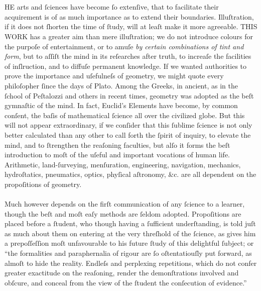 \pagestyle{fancy}
\fancyhf{}
\renewcommand{\headrulewidth}{0pt}
\fancyfoot[C]{\thepage}%

\section[Introduction]{}
\label{sec:intro}

\hfill

\lettrine[lines=3, loversize=1, nindent=0pt]{}{}HE arts and ſciences have become ſo extenſive, that to facilitate their acquirement is of as much importance as to extend their boundaries. Illuſtration, if it does not ſhorten the time of ſtudy, will at leaſt make it more agreeable. T\textsc{HIS WORK} has a greater aim than mere illuſtration; we do not introduce colours for the purpoſe of entertainment, or to amuſe \textit{by certain combinations of tint and form}, but to aſſiſt the mind in its reſearches after truth, to increaſe the facilities of inſlruction, and to diffuſe permanent knowledge. If we wanted authorities to prove the importance and uſefulneſs of geometry, we might quote every philoſopher ſince the days of Plato. Among the Greeks, in ancient, as in the ſchool of Peſtalozzi and others in recent times, geometry was adopted as the beſt gymnaſtic of the mind. In fact, Euclid’s Elements have become, by common conſent, the baſis of mathematical ſcience all over the civilized globe. But this will not appear extraordinary, if we conſider that this ſublime ſcience is not only better calculated than any other to call forth the ſpirit of inquiry, to elevate the mind, and to ſtrengthen the reaſoning faculties, but alſo it forms the beſt introduction to moſt of the uſeful and important vocations of human life.  Arithmetic, land-ſurveying, menſuration, engineering, navigation, mechanics, hydroſtatics, pneumatics, optics, phyſical aſtronomy, \&c. are all dependent on the propoſitions of geometry.\\
\hfill\\
Much however depends on the firſt communication of any ſcience to a learner, though the beſt and moſt eaſy methods are ſeldom adopted.  Propoſitions are placed before a ſtudent, who though having a ſufficient underſtanding, is told juſt as much about them on entering at the very threſhold of the ſcience, as gives him a prepoſſeſſion moſt unfavourable to his future ſtudy of this delightful ſubject; or “the formalities and paraphernalia of rigour are ſo oſtentatiouſly put forward, as almoſt to hide the reality. Endleſs and perplexing repetitions, which do not confer greater exactitude on the reaſoning, render the demonſtrations involved and obſcure, and conceal from the view of the ſtudent the conſecution of evidence.”\\
